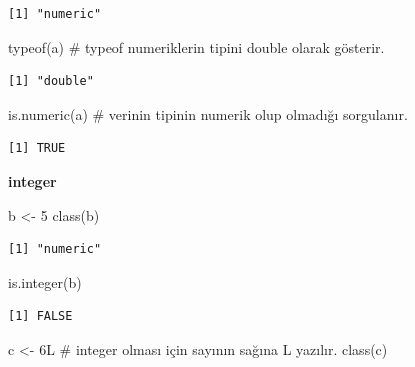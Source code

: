 \documentclass[
  letterpaper,
  DIV=11,
  numbers=noendperiod]{scrreprt}
\newenvironment{Shaded}{\begin{snugshade}}{\end{snugshade}}
\newcommand{\CommentTok}[1]{\textcolor[rgb]{0.37,0.37,0.37}{#1}}
\newcommand{\DecValTok}[1]{\textcolor[rgb]{0.68,0.00,0.00}{#1}}
\newcommand{\FunctionTok}[1]{\textcolor[rgb]{0.28,0.35,0.67}{#1}}
\newcommand{\NormalTok}[1]{\textcolor[rgb]{0.00,0.23,0.31}{#1}}
\newcommand{\OtherTok}[1]{\textcolor[rgb]{0.00,0.23,0.31}{#1}}
\begin{document}
\begin{verbatim}
[1] "numeric"
\end{verbatim}

\begin{Shaded}
\begin{Highlighting}[]
\FunctionTok{typeof}\NormalTok{(a) }\CommentTok{\# typeof numeriklerin tipini double olarak gösterir.}
\end{Highlighting}
\end{Shaded}

\begin{verbatim}
[1] "double"
\end{verbatim}

\begin{Shaded}
\begin{Highlighting}[]
\FunctionTok{is.numeric}\NormalTok{(a) }\CommentTok{\# verinin tipinin numerik olup olmadığı sorgulanır.}
\end{Highlighting}
\end{Shaded}

\begin{verbatim}
[1] TRUE
\end{verbatim}

\textbf{integer}

\begin{Shaded}
\begin{Highlighting}[]
\NormalTok{b }\OtherTok{\textless{}{-}} \DecValTok{5}
\FunctionTok{class}\NormalTok{(b)}
\end{Highlighting}
\end{Shaded}

\begin{verbatim}
[1] "numeric"
\end{verbatim}

\begin{Shaded}
\begin{Highlighting}[]
\FunctionTok{is.integer}\NormalTok{(b)}
\end{Highlighting}
\end{Shaded}

\begin{verbatim}
[1] FALSE
\end{verbatim}

\begin{Shaded}
\begin{Highlighting}[]
\NormalTok{c }\OtherTok{\textless{}{-}} \DecValTok{6}\NormalTok{L }\CommentTok{\# integer olması için sayının sağına L yazılır.}
\FunctionTok{class}\NormalTok{(c)}
\end{Highlighting}
\end{Shaded}
\end{document}
